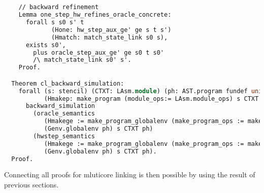 \begin{lstlisting}[language=Caml]


    // backward refinement
    Lemma one_step_hw_refines_oracle_concrete:
      forall s s0 s' t
             (Hone: hw_step_aux_ge' ge s t s')
             (Hmatch: match_state_link s0 s),
      exists s0',
        plus oracle_step_aux_ge' ge s0 t s0'
        /\ match_state_link s0' s'.
    Proof.

  Theorem cl_backward_simulation:
    forall (s: stencil) (CTXT: LAsm.module) (ph: AST.program fundef unit)
           (Hmakep: make_program (module_ops:= LAsm.module_ops) s CTXT (mboot <@$\oplus$@> L64) = OK ph),
      backward_simulation
        (oracle_semantics 
           (Hmakege := make_program_globalenv (make_program_ops := make_program_ops) _ _ _ _ Hmakep)
           (Genv.globalenv ph) s CTXT ph)
        (hwstep_semantics 
           (Hmakege := make_program_globalenv (make_program_ops := make_program_ops) _ _ _ _ Hmakep)
           (Genv.globalenv ph) s CTXT ph).
  Proof.
\end{lstlisting}

Connecting all proofs for mluticore linking is then possible by using the result of previous sections.